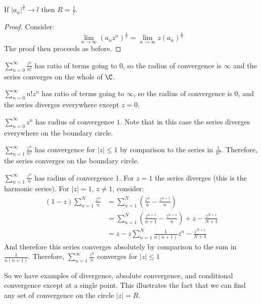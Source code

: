 \documentclass[../Main.tex]{subfiles}
\begin{document}
\begin{lemma}
    If $|a_n|^\frac{1}{n} \to l$ then $R = \frac{1}{l}$.
    \label{lemRootReciprocalRadius}
\end{lemma}
\begin{proof}
    Consider:
    \begin{equation*}
        \lim_{n \to \infty} \left(a_n z^n\right)^{\frac{1}{n}} = \lim_{n \to \infty} z (a_n)^{\frac{1}{n}}
    \end{equation*}
    The proof then proceeds as before.
\end{proof}
\begin{examples}{}
    \item $\sum_{n=0}^\infty \frac{z^n}{n!}$ has ratio of terms going to $0$, so the radius of convergence is $\infty$ and the series converges on the whole of $\C$.
    \item $\sum_{n=0}^\infty n! z^n$ has ratio of terms going to $\infty$, so the radius of convergence is $0$, and the series diverges everywhere except $z = 0$.
    \item $\sum_{n=0}^\infty z^n$ has radius of convergence $1$. Note that in this case the series diverges everywhere on the boundary circle.
    \item $\sum_{n=1}^\infty \frac{z^n}{n^2}$ has convergence for $|z| \leq 1$ by comparison to the series in $\frac{1}{n^2}$. Therefore, the series converges on the boundary circle.
    \item $\sum_{n=1}^\infty \frac{z^n}{n}$ has radius of convergence 1. For $z = 1$ the series diverges (this is the harmonic series). For $|z| = 1$, $z \neq 1$, consider:
        \begin{align*}
		(1-z)\sum_{n=1}^N \frac{z^n}{n} &= \sum_{n=1}^N \left(\frac{z^n}{n} - \frac{z^{n+1}}{n}\right) \\
		&= \sum_{n=1}^N \left(\frac{z^{n+1}}{n+1} - \frac{z^{n+1}}{n}\right) + z - \frac{z^{N+1}}{N+1} \\
		&= z - z \sum_{n=1}^N \frac{1}{n(n+1)} z^n - \frac{z^{N+1}}{N+1}
	\end{align*}
	And therefore this series converges absolutely by comparison to the sum in $\frac{1}{n(n+1)}$. Therefore, $\sum_{n=1}^\infty \frac{z^n}{n}$ converges for $|z| \leq 1$
\end{examples}
So we have examples of divergence, absolute convergence, and conditional convergence except at a single point. This illustrates the fact that we can find any set of convergence on the circle $|z| = R$.
\end{document}
